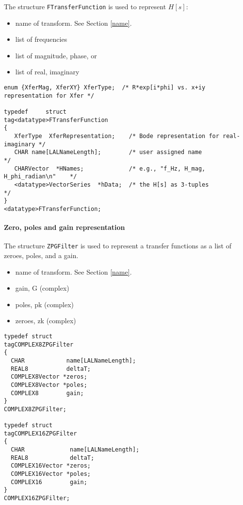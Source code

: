 \documentclass[]{ligodcc}
\begin{document}
The structure {\tt FTransferFunction} is used to represent $H[s]$:

\begin{itemize}
\vspace{-0.1in}
\item
name of transform.  See Section \ref{name}.
\vspace{-0.1in}
\item
list of frequencies
\vspace{-0.1in}
\item
list of magnitude, phase, or
\vspace{-0.1in}
\item
list of real, imaginary
\end{itemize}


{\footnotesize
\begin{verbatim}
enum {XferMag, XferXY} XferType;  /* R*exp[i*phi] vs. x+iy representation for Xfer */

typedef		struct 			
tag<datatype>FTransferFunction
{
   XferType  XferRepresentation;    /* Bode representation for real-imaginary */
   CHAR name[LALNameLength];        /* user assigned name                     */
   CHARVector  *HNames;             /* e.g., "f_Hz, H_mag, H_phi_radian\n"    */
   <datatype>VectorSeries  *hData;  /* the H[s] as 3-tuples                   */
}
<datatype>FTransferFunction;
\end{verbatim}}

\paragraph{Zero, poles and gain representation \\}

The structure {\tt ZPGFilter} is used to represent a transfer functions as a
list of zeroes, poles, and a gain.


\begin{itemize}
\vspace{-0.1in}
\item
name of transform. See Section \ref{name}.
\vspace{-0.1in}
\item
gain, G (complex)
\vspace{-0.1in}
\item
poles, pk (complex)
\vspace{-0.1in}
\item
zeroes, zk (complex)
\end{itemize}

{\footnotesize
\begin{verbatim}
typedef struct
tagCOMPLEX8ZPGFilter
{
  CHAR            name[LALNameLength];
  REAL8           deltaT;
  COMPLEX8Vector *zeros;
  COMPLEX8Vector *poles;
  COMPLEX8        gain;
}
COMPLEX8ZPGFilter;

typedef struct
tagCOMPLEX16ZPGFilter
{
  CHAR             name[LALNameLength];
  REAL8            deltaT;
  COMPLEX16Vector *zeros;
  COMPLEX16Vector *poles;
  COMPLEX16        gain;
}
COMPLEX16ZPGFilter;
\end{verbatim}}
\end{document}
